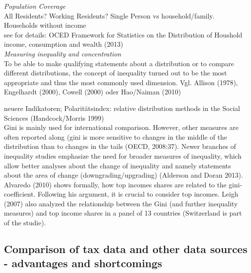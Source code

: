 \emph{Population Coverage} \\
All Residents? Working Residents? Single Person vs household/family. Households without income \\
see for details: OCED Framework for Statistics on the Distribution of Houshold income, consumption and wealth (2013) \\

\emph{Measuring inequality and concentration} \\
To be able to make qualifying statements about a distribution or to compare different distributions, the concept of inequality turned out to be the most appropriate and thus the most commonly used dimension. Vgl. Allison (1978), Engelhardt (2000), Cowell (2000) oder Hao/Naiman (2010)

neuere Indikatoren; Polaritätsindex: relative distribution methods in the Social Sciences (Handcock/Morris 1999) \\

Gini is mainly used for international comparison. However, other measures are often reported along (gini is more sensitive to changes in the middle of the distribution than to changes in the tails (OECD, 2008:37). Newer branches of inequality studies emphasize the need for broader measures of inequality, which allow better analyses about the change of inequality and namely statements about the area of change (downgrading/upgrading) (Alderson and Doran 2013). \\

Alvaredo (2010) shows formally, how top incomes shares are related to the gini-coefficient. Following his argument, it is crucial to consider top incomes. Leigh (2007) also analyzed the relationship between the Gini (and further inequality measures) and top income shares in a panel of 13 countries (Switzerland is part of the studie). 

\subsection{Comparison of tax data and other data sources - advantages and shortcomings}

